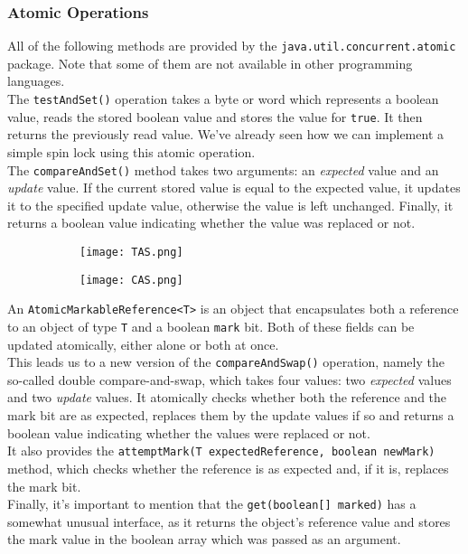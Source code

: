 \documentclass[main]{subfiles}
\begin{document}
\subsubsection{Atomic Operations}
All of the following methods are provided by the \texttt{java.util.concurrent.atomic} package. Note that some of them are not available in other programming languages.\\[3mm]
The \texttt{testAndSet()} operation takes a byte or word which represents a boolean value, reads the stored boolean value and stores the value for \texttt{true}. It then returns the previously read value. We've already seen how we can implement a simple spin lock using this atomic operation.\\[3mm]
The \texttt{compareAndSet()} method takes two arguments: an \textit{expected} value and an \textit{update} value. If the current stored value is equal to the expected value, it updates it to the specified update value, otherwise the value is left unchanged. Finally, it returns a boolean value indicating whether the value was replaced or not.\\
\begin{figure}[H]
    \centering
    \begin{subfigure}{.5\textwidth}
        \centering
        \texttt{[image: TAS.png]}
    \end{subfigure}%
    \begin{subfigure}{.5\textwidth}
        \centering
        \texttt{[image: CAS.png]}
    \end{subfigure}
\end{figure}
\noindent An \texttt{AtomicMarkableReference<T>} is an object that encapsulates both a reference to an object of type \texttt{T} and a boolean \texttt{mark} bit. Both of these fields can be updated atomically, either alone or both at once.\\
This leads us to a new version of the \texttt{compareAndSwap()} operation, namely the so-called double compare-and-swap, which takes four values: two \textit{expected} values and two \textit{update} values. It atomically checks whether both the reference and the mark bit are as expected, replaces them by the update values if so and returns a boolean value indicating whether the values were replaced or not.\\
It also provides the \texttt{attemptMark(T expectedReference, boolean newMark)} method, which checks whether the reference is as expected and, if it is, replaces the mark bit. \\
Finally, it's important to mention that the \texttt{get(boolean[] marked)} has a somewhat unusual interface, as it returns the object's reference value and stores the mark value in the boolean array which was passed as an argument.
\end{document}
